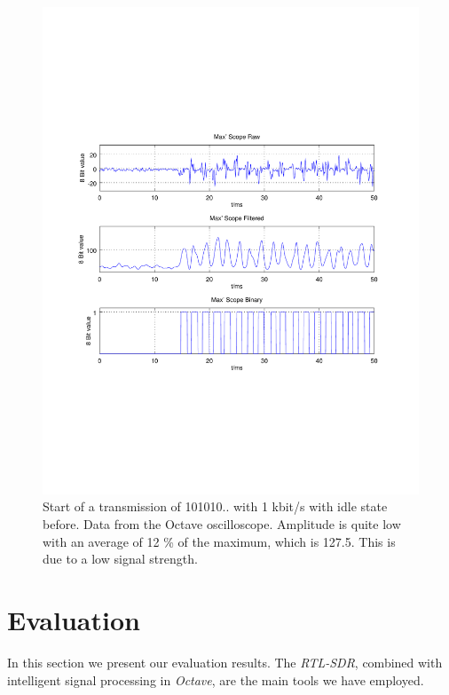 \documentclass[conference]{IEEEtran}
\begin{document}
\begin{figure}[h]
\centering
\includegraphics[width=\columnwidth]{./fig/transmission}
\caption{Start of a transmission of 101010.. with 1 kbit/s with idle state before. Data from the Octave oscilloscope. Amplitude is quite low with an average of 12 \% of the maximum, which is 127.5. This is due to a low signal strength.}
\label{fig:transmission}
\end{figure}

\section{Evaluation}
In this section we present our evaluation results. The \textit{RTL-SDR}, combined with intelligent signal processing in \textit{Octave}, are the main tools we have employed. 
\end{document}
